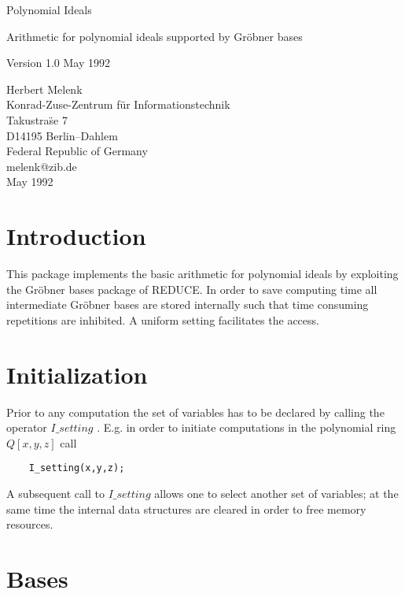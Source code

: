 
\begin{center} {\Large Polynomial Ideals} \end{center}
\begin{center} Arithmetic for polynomial ideals supported by 
Gr\"obner bases \end{center}
\begin{center} Version 1.0 May 1992 \end{center}

\begin{center} Herbert Melenk \\ Konrad-Zuse-Zentrum f\"ur
Informationstechnik \\
Takustra\"se 7 \\ D14195 Berlin--Dahlem \\ Federal Republic of Germany \\ 
melenk@zib.de \\ May 1992 \end{center}

\section{Introduction}

This package implements the basic arithmetic for polynomial ideals
by exploiting the Gr\"obner bases package of REDUCE.
In order to save computing time all intermediate Gr\"obner bases
are stored internally such that time consuming repetitions
are inhibited. A uniform setting facilitates the access.

\section{Initialization}

Prior to any computation the set of variables has to be declared
by calling the operator $I\_setting$ . E.g. in order to initiate
computations in the polynomial ring $Q[x,y,z]$ call
\begin{verbatim}
    I_setting(x,y,z);
\end{verbatim}
A subsequent call to $I\_setting$ allows one to select another set
of variables; at the same time the internal data structures
are cleared in order to free memory resources.

\section{Bases}


